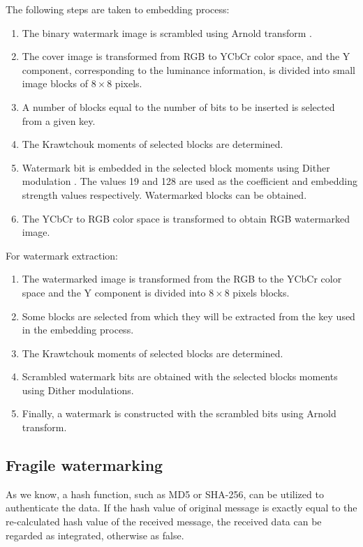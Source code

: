 \documentclass[runningheads]{llncs}
\begin{document}
The following steps are taken to embedding process:
\begin{enumerate}
	\item The binary watermark image is scrambled using Arnold transform \cite{Arnol'd:1987366}.
	\item The cover image is transformed from RGB to YCbCr color space, and the Y component, corresponding to the luminance information, is divided into small image blocks of $8\times 8$ pixels.
	\item A number of blocks equal to the number of bits to be inserted is selected from a given key.
	\item The Krawtchouk moments \cite{Yap2003} of selected blocks are determined.
	\item Watermark bit is embedded in the selected block moments using Dither modulation \cite{chen2001quantization}. The values 19 and 128 are used as the coefficient and embedding strength values respectively. Watermarked blocks can be obtained. 
	\item The YCbCr to RGB color space is transformed to obtain RGB watermarked image.
\end{enumerate}

For watermark extraction:
\begin{enumerate}
	\item The watermarked image is transformed from the RGB to the YCbCr color space and the Y component is divided into $8\times 8$ pixels blocks.
	\item Some blocks are selected from which they will be extracted from the key used in the embedding process.
	\item The Krawtchouk moments of selected blocks are determined.
	\item Scrambled watermark bits are obtained with the selected blocks moments using Dither modulations.
	\item Finally, a watermark is constructed with the scrambled bits using Arnold transform.
\end{enumerate}

\subsection{Fragile watermarking}
As we know, a hash function, such as MD5 or SHA-256, can be utilized to authenticate the data. If the hash value of original message is exactly equal to the re-calculated hash value of the received message, the received data can be regarded as integrated, otherwise as false.
\end{document}
